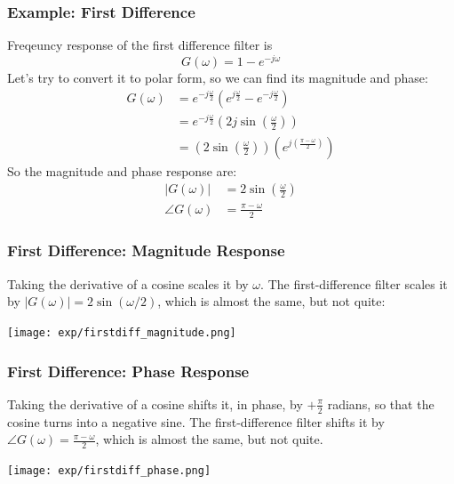 \documentclass{beamer}
\begin{document}
\begin{frame}
  \frametitle{Example: First Difference}

  Freqeuncy response of the first difference filter is
  \[
  G(\omega) = 1-e^{-j\omega}
  \]
  Let's try to convert it to polar form, so we can find its magnitude and phase:
  \begin{align*}
    G(\omega) &= e^{-j\frac{\omega}{2}} \left(e^{j\frac{\omega}{2}}-e^{-j\frac{\omega}{2}}\right)\\
    &= e^{-j\frac{\omega}{2}} \left(2j\sin\left(\frac{\omega}{2}\right)\right)\\
    &= \left(2\sin\left(\frac{\omega}{2}\right)\right)\left(e^{j\left(\frac{\pi-\omega}{2}\right)}\right)
  \end{align*}
  So the magnitude and phase response are:
  \begin{align*}
    |G(\omega)| &= 2\sin\left(\frac{\omega}{2}\right)\\
    \angle G(\omega) &= \frac{\pi-\omega}{2}
  \end{align*}
\end{frame}

\begin{frame}
  \frametitle{First Difference: Magnitude Response}
  Taking the derivative of a cosine scales it by $\omega$.  The first-difference
  filter scales it by $|G(\omega)|=2\sin(\omega/2)$, which is almost the same, but not quite:
  \centerline{\texttt{[image: exp/firstdiff\_magnitude.png]}}
\end{frame}

\begin{frame}
  \frametitle{First Difference: Phase Response}

  Taking the derivative of a cosine shifts it, in phase, by
  $+\frac{\pi}{2}$ radians, so that the cosine turns into a negative
  sine.  The first-difference filter shifts it by $\angle
  G(\omega)=\frac{\pi-\omega}{2}$, which is almost the same, but not
  quite.
  \centerline{\texttt{[image: exp/firstdiff\_phase.png]}}
\end{frame}
\end{document}
